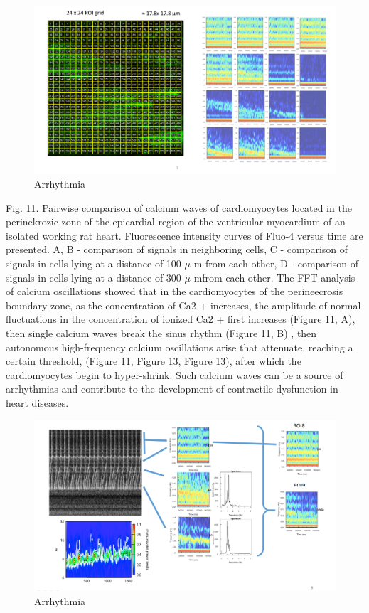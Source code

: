 \documentclass[a4paper,12pt]{article}
\begin{document}
\begin{figure}
    \includegraphics[width=\linewidth]{fig5.png}
    \caption{Arrhythmia}
    \label{fig:fig5}
\end{figure}

Fig. 11. Pairwise comparison of calcium waves of cardiomyocytes located in the perinekrozic zone of the epicardial region of the ventricular myocardium of an isolated working rat heart. Fluorescence intensity curves of Fluo-4 versus time are presented. A, B - comparison of signals in neighboring cells, C - comparison of signals in cells lying at a distance of 100 $\mu$ m from each other, D - comparison of signals in cells lying at a distance of 300 $\mu$  mfrom each other.
The FFT analysis of calcium oscillations showed that in the cardiomyocytes of the perineecrosis boundary zone, as the concentration of Ca2 + increases, the amplitude of normal fluctuations in the concentration of ionized Ca2 + first increases (Figure 11, A), then single calcium waves break the sinus rhythm (Figure 11, B) , then autonomous high-frequency calcium oscillations arise that attenuate, reaching a certain threshold, (Figure 11, Figure 13, Figure 13), after which the cardiomyocytes begin to hyper-shrink. Such calcium waves can be a source of arrhythmias and contribute to the development of contractile dysfunction in heart diseases.

\begin{figure}
    \includegraphics[width=\linewidth]{fig6.png}
    \caption{Arrhythmia}
    \label{fig:fig6}
\end{figure}
\end{document}
